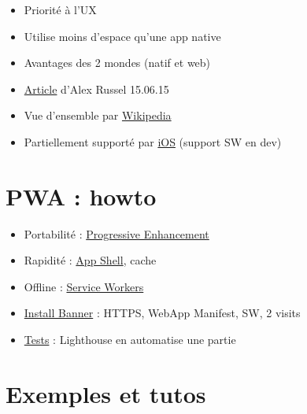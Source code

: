 \begin{itemize}
\tightlist
\item
  Priorité à l'UX
\item
  Utilise moins d'espace qu'une app native
\item
  Avantages des 2 mondes (natif et web)
\item
  \href{https://infrequently.org/2015/06/progressive-apps-escaping-tabs-without-losing-our-soul/}{Article}
  d'Alex Russel 15.06.15
\item
  Vue d'ensemble par
  \href{https://en.wikipedia.org/wiki/Progressive_web_app}{Wikipedia}
\item
  Partiellement supporté par
  \href{https://stackoverflow.com/questions/41185471/what-is-progressive-web-app-solution-for-ios}{iOS}
  (support SW en dev)
\end{itemize}

\hypertarget{pwa-howto}{%
\section{PWA : howto}\label{pwa-howto}}

\begin{itemize}
\tightlist
\item
  Portabilité :
  \href{https://www.smashingmagazine.com/2009/04/progressive-enhancement-what-it-is-and-how-to-use-it/}{Progressive
  Enhancement}
\item
  Rapidité :
  \href{https://developers.google.com/web/updates/2015/11/app-shell}{App
  Shell}, cache
\item
  Offline :
  \href{https://jakearchibald.com/2014/service-worker-first-draft/}{Service
  Workers}
\item
  \href{https://developers.google.com/web/fundamentals/app-install-banners/}{Install
  Banner} : HTTPS, WebApp Manifest, SW, 2 visits
\item
  \href{https://developers.google.com/web/progressive-web-apps/checklist}{Tests}
  : Lighthouse en automatise une partie
\end{itemize}

\hypertarget{exemples-et-tutos}{%
\section{Exemples et tutos}\label{exemples-et-tutos}}

